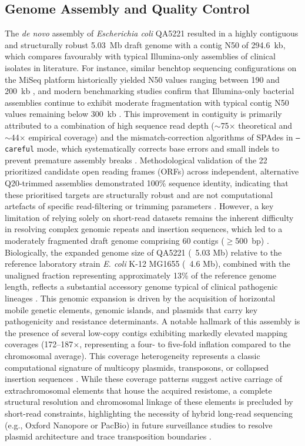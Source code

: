 \documentclass[pdflatex,sn-mathphys-num]{sn-jnl}
\begin{document}
\subsection{Genome Assembly and Quality Control}
The \textit{de novo} assembly of \textit{Escherichia coli} QA5221 resulted in a highly contiguous and structurally robust 5.03~Mb draft genome with a contig N50 of 294.6~kb, which compares favourably with typical Illumina-only assemblies of clinical isolates in literature. For instance, similar benchtop sequencing configurations on the MiSeq platform historically yielded N50 values ranging between 190 and 200~kb \cite{loman2013performance}, and modern benchmarking studies confirm that Illumina-only bacterial assemblies continue to exhibit moderate fragmentation with typical contig N50 values remaining below 300~kb \cite{wick2021benchmarking}. This improvement in contiguity is primarily attributed to a combination of high sequence read depth ($\sim$75$\times$ theoretical and $\sim$44$\times$ empirical coverage) and the mismatch-correction algorithms of SPAdes in \texttt{--careful} mode, which systematically corrects base errors and small indels to prevent premature assembly breaks \cite{bankevich2012spades}. Methodological validation of the 22 prioritized candidate open reading frames (ORFs) across independent, alternative Q20-trimmed assemblies demonstrated 100\% sequence identity, indicating that these prioritised targets are structurally robust and are not computational artefacts of specific read-filtering or trimming parameters \cite{olson2015best}. However, a key limitation of relying solely on short-read datasets remains the inherent difficulty in resolving complex genomic repeats and insertion sequences, which led to a moderately fragmented draft genome comprising 60 contigs ($\geq$500~bp) \cite{treangen2012repetitive,wick2021benchmarking}. Biologically, the expanded genome size of QA5221 (~5.03 Mb) relative to the reference laboratory strain \textit{E. coli} K-12 MG1655 (~4.6 Mb), combined with the unaligned fraction representing approximately 13\% of the reference genome length, reflects a substantial accessory genome typical of clinical pathogenic lineages \cite{touchon2009organised,ghalayini2022distinct}. This genomic expansion is driven by the acquisition of horizontal mobile genetic elements, genomic islands, and plasmids that carry key pathogenicity and resistance determinants. A notable hallmark of this assembly is the presence of several low-copy contigs exhibiting markedly elevated mapping coverages (172--187$\times$, representing a four- to five-fold inflation compared to the chromosomal average). This coverage heterogeneity represents a classic computational signature of multicopy plasmids, transposons, or collapsed insertion sequences \cite{carattoli2013plasmid,antipov2016plasmidspades,robertson2020mob}. While these coverage patterns suggest active carriage of extrachromosomal elements that house the acquired resistome, a complete structural resolution and chromosomal linkage of these elements is precluded by short-read constraints, highlighting the necessity of hybrid long-read sequencing (e.g., Oxford Nanopore or PacBio) in future surveillance studies to resolve plasmid architecture and trace transposition boundaries \cite{villa2013plasmidomics,fuga2024hybrid}. 
\end{document}
